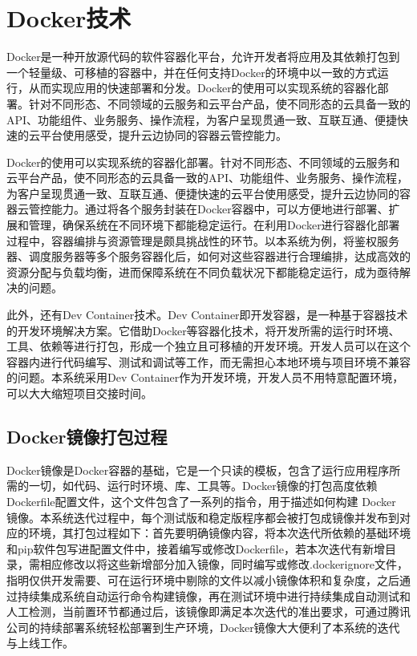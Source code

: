 \section{Docker技术}

Docker是一种开放源代码的软件容器化平台，允许开发者将应用及其依赖打包到一个轻量级、可移植的容器中，并在任何支持Docker的环境中以一致的方式运行，从而实现应用的快速部署和分发\cite{8}。Docker的使用可以实现系统的容器化部署。针对不同形态、不同领域的云服务和云平台产品，使不同形态的云具备一致的API、功能组件、业务服务、操作流程，为客户呈现贯通一致、互联互通、便捷快速的云平台使用感受，提升云边协同的容器云管控能力\cite{24}。

Docker的使用可以实现系统的容器化部署。针对不同形态、不同领域的云服务和云平台产品，使不同形态的云具备一致的API、功能组件、业务服务、操作流程，为客户呈现贯通一致、互联互通、便捷快速的云平台使用感受，提升云边协同的容器云管控能力\cite{6}。通过将各个服务封装在Docker容器中，可以方便地进行部署、扩展和管理，确保系统在不同环境下都能稳定运行。在利用Docker进行容器化部署过程中，容器编排与资源管理是颇具挑战性的环节。以本系统为例，将鉴权服务器、调度服务器等多个服务容器化后，如何对这些容器进行合理编排，达成高效的资源分配与负载均衡，进而保障系统在不同负载状况下都能稳定运行，成为亟待解决的问题。

此外，还有Dev Container技术。Dev Container即开发容器，是一种基于容器技术的开发环境解决方案。它借助Docker等容器化技术，将开发所需的运行时环境、工具、依赖等进行打包，形成一个独立且可移植的开发环境。开发人员可以在这个容器内进行代码编写、测试和调试等工作，而无需担心本地环境与项目环境不兼容的问题。本系统采用Dev Container作为开发环境，开发人员不用特意配置环境，可以大大缩短项目交接时间。

\subsection{Docker镜像打包过程}

Docker镜像是Docker容器的基础，它是一个只读的模板，包含了运行应用程序所需的一切，如代码、运行时环境、库、工具等。Docker镜像的打包高度依赖Dockerfile配置文件，这个文件包含了一系列的指令，用于描述如何构建 Docker 镜像。本系统迭代过程中，每个测试版和稳定版程序都会被打包成镜像并发布到对应的环境，其打包过程如下：首先要明确镜像内容，将本次迭代所依赖的基础环境和pip软件包写进配置文件中，接着编写或修改Dockerfile，若本次迭代有新增目录，需相应修改以将这些新增部分加入镜像，同时编写或修改.dockerignore文件，指明仅供开发需要、可在运行环境中剔除的文件以减小镜像体积和复杂度，之后通过持续集成系统自动运行命令构建镜像，再在测试环境中进行持续集成自动测试和人工检测，当前置环节都通过后，该镜像即满足本次迭代的准出要求，可通过腾讯公司的持续部署系统轻松部署到生产环境，Docker镜像大大便利了本系统的迭代与上线工作。

